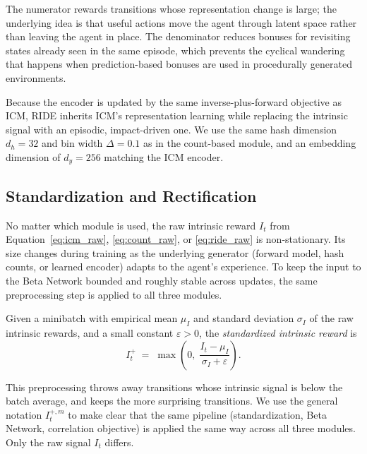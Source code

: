 The numerator rewards transitions whose representation change is large; the underlying idea is that useful actions move the agent through latent space rather than leaving the agent in place. The denominator reduces bonuses for revisiting states already seen in the same episode, which prevents the cyclical wandering that happens when prediction-based bonuses are used in procedurally generated environments.

Because the encoder is updated by the same inverse-plus-forward objective as ICM, RIDE inherits ICM's representation learning while replacing the intrinsic signal with an episodic, impact-driven one. We use the same hash dimension $d_h = 32$ and bin width $\Delta = 0.1$ as in the count-based module, and an embedding dimension of $d_y = 256$ matching the ICM encoder.

\subsection{Standardization and Rectification}
\label{sec:standardization}

No matter which module is used, the raw intrinsic reward $I_t$ from Equation~\eqref{eq:icm_raw}, \eqref{eq:count_raw}, or \eqref{eq:ride_raw} is non-stationary. Its size changes during training as the underlying generator (forward model, hash counts, or learned encoder) adapts to the agent's experience. To keep the input to the Beta Network bounded and roughly stable across updates, the same preprocessing step is applied to all three modules.

\begin{definition}
\label{def:standardized_intrinsic}
Given a minibatch with empirical mean $\mu_I$ and standard deviation $\sigma_I$ of the raw intrinsic rewards, and a small constant $\varepsilon > 0$, the \emph{standardized intrinsic reward} is
\begin{equation}
I_t^+ \;=\; \max\!\left( 0,\; \frac{I_t - \mu_I}{\sigma_I + \varepsilon} \right).
\label{eq:icm_standardized}
\end{equation}
\end{definition}

This preprocessing throws away transitions whose intrinsic signal is below the batch average, and keeps the more surprising transitions. We use the general notation $I_t^{+,m}$ to make clear that the same pipeline (standardization, Beta Network, correlation objective) is applied the same way across all three modules. Only the raw signal $I_t$ differs.

